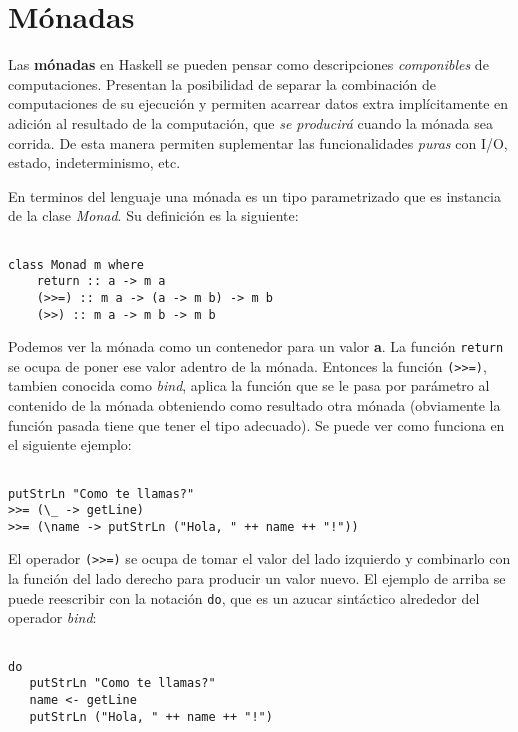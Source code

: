 \section{Mónadas} %
\label{sec:m_nadas}

Las \textbf{mónadas} en Haskell se pueden pensar como descripciones
\textit{componibles} de computaciones. Presentan la posibilidad de separar la
combinación de computaciones de su ejecución y permiten acarrear datos extra
implícitamente en adición al resultado de la computación, que
\textit{se producirá} cuando la mónada sea corrida. De esta manera permiten
suplementar las funcionalidades \textit{puras} con I/O, estado, indeterminismo,
etc.

En terminos del lenguaje una mónada es un tipo parametrizado que es instancia
de la clase \textit{Monad}. Su definición es la siguiente:

\begin{lstlisting}

class Monad m where
    return :: a -> m a
    (>>=) :: m a -> (a -> m b) -> m b
    (>>) :: m a -> m b -> m b

\end{lstlisting}

Podemos ver la mónada como un contenedor para un valor \textbf{a}. La función
\lstinline$return$ se ocupa de poner ese valor adentro de la mónada. Entonces
la función \lstinline$(>>=)$, tambien conocida como \textit{bind}, aplica la
función que se le pasa por parámetro al contenido de la mónada obteniendo como
resultado otra mónada (obviamente la función pasada tiene que tener el tipo
adecuado). Se puede ver como funciona en el siguiente ejemplo:

\begin{lstlisting}

putStrLn "Como te llamas?"
>>= (\_ -> getLine)
>>= (\name -> putStrLn ("Hola, " ++ name ++ "!"))

\end{lstlisting}

El operador \lstinline$(>>=)$ se ocupa de tomar el valor del lado izquierdo
y combinarlo con la función del lado derecho para producir un valor nuevo. El
ejemplo de arriba se puede reescribir con la notación \lstinline$do$, que es un
azucar sintáctico alrededor del operador \textit{bind}:

\begin{lstlisting}

do
   putStrLn "Como te llamas?"
   name <- getLine
   putStrLn ("Hola, " ++ name ++ "!")

\end{lstlisting}

